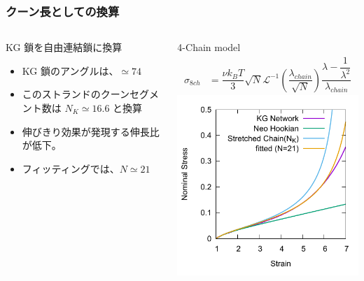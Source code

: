 \documentclass[11pt, dvipdfmx]{beamer}
\begin{document}
\begin{frame}
\frametitle{クーン長としての換算}
\begin{columns}[totalwidth=1\textwidth]
\small
\begin{alertblock}{KG 鎖を自由連結鎖に換算}
\begin{itemize}
\item
KG 鎖のアングルは、$\simeq74$
\item
このストランドのクーンセグメント数は $N_K\simeq16.6$ と換算
\item
伸びきり効果が発現する伸長比が低下。
\item
フィッティングでは、$N\simeq21$
\end{itemize}
\end{alertblock}
\footnotesize
4-Chain model
\tiny
\begin{align*}
\sigma_{8ch}
	&= \dfrac{\nu k_B T }{3}\sqrt{N}
			\mathcal{L}^{-1} \left(\dfrac{\lambda_{chain}}{ \sqrt{N} } \right)
			\dfrac{\lambda-\dfrac{1}{\lambda^2}}{\lambda_{chain}} 
\end{align*}
\centering
\includegraphics[width=\columnwidth]{./fig/SS_Kuhn.pdf}
\end{columns}
\end{frame}
\end{document}
